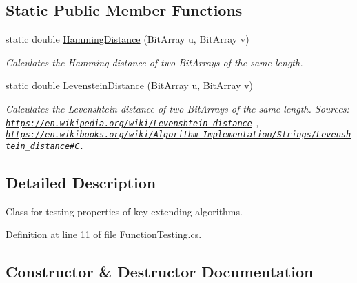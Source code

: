 \subsection*{Static Public Member Functions}
\begin{DoxyCompactItemize}
\item 
static double \hyperlink{class_crypto_1_1_function_testing_a643a83c8528858b2cfe531c176162796}{Hamming\+Distance} (Bit\+Array u, Bit\+Array v)
\begin{DoxyCompactList}\small\item\em Calculates the Hamming distance of two Bit\+Arrays of the same length. \end{DoxyCompactList}\item 
static double \hyperlink{class_crypto_1_1_function_testing_a88a16df256e6d63d43fbbb3b5c644f29}{Levenstein\+Distance} (Bit\+Array u, Bit\+Array v)
\begin{DoxyCompactList}\small\item\em Calculates the Levenshtein distance of two Bit\+Arrays of the same length. Sources\+: \href{https://en.wikipedia.org/wiki/Levenshtein_distance}{\tt https\+://en.\+wikipedia.\+org/wiki/\+Levenshtein\+\_\+distance} , \href{https://en.wikibooks.org/wiki/Algorithm_Implementation/Strings/Levenshtein_distance#C.23}{\tt https\+://en.\+wikibooks.\+org/wiki/\+Algorithm\+\_\+\+Implementation/\+Strings/\+Levenshtein\+\_\+distance\#\+C.} \end{DoxyCompactList}\end{DoxyCompactItemize}


\subsection{Detailed Description}
Class for testing properties of key extending algorithms. 



Definition at line 11 of file Function\+Testing.\+cs.



\subsection{Constructor \& Destructor Documentation}
\hypertarget{class_crypto_1_1_function_testing_aa62a4223204dece41f9cc6fac9882834}{}
